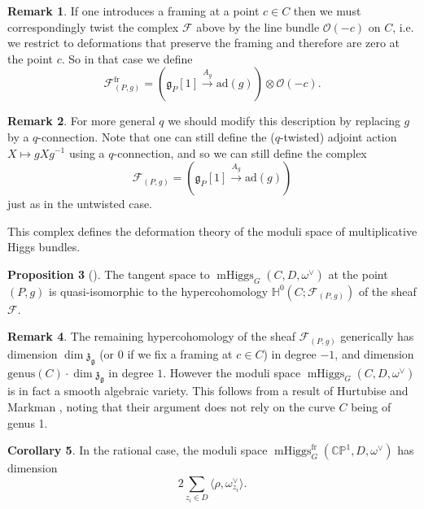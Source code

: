 \documentclass[11pt, oneside, reqno]{amsart}
\theoremstyle{definition} \newtheorem{definition}{Definition}[section]
\newtheorem{prop}[definition]{Proposition}
\newtheorem{corollary}[definition]{Corollary}
\theoremstyle{definition} \newtheorem{remark}[definition]{Remark}
\theoremstyle{definition} \newtheorem{remarks}[definition]{Remarks}
\theoremstyle{definition} \newtheorem{question}[definition]{Question}
\theoremstyle{definition} \newtheorem*{note}{Note}
\theoremstyle{definition} \newtheorem{example}[definition]{Example}
\theoremstyle{definition} \newtheorem{examples}[definition]{Examples}
\renewcommand{\gg}{\mathfrak{g}}
\newcommand{\bb}[1]{\mathbb{#1}}
\newcommand{\mr}[1]{\mathrm{#1}}
\newcommand{\mc}[1]{\mathcal{#1}}
\newcommand{\mf}[1]{\mathfrak{#1}}
\newcommand{\OO}{\mathcal{O}}
\DeclareMathOperator{\mhiggs}{mHiggs}
\newcommand{\fr}{\mathrm{fr}}
\newcommand{\ad}{\mr{ad}}
\begin{document}
\begin{remark}
If one introduces a framing at a point $c \in C$ then we must correspondingly twist the complex $\mc F$ above by the line bundle $\OO(-c)$ on $C$, i.e. we restrict to deformations that preserve the framing and therefore are zero at the point $c$.  So in that case we define
\[\mc F^\fr_{(P,g)} = (\gg_P[1] \overset {A_g} {\to} \ad(g)) \otimes \OO(-c).\]
\end{remark}

\begin{remark}
For more general $q$ we should modify this description by replacing $g$ by a $q$-connection.  Note that one can still define the ($q$-twisted) adjoint action $X \mapsto g X g^{-1}$ using a $q$-connection, and so we can still define the complex
\[\mc F_{(P,g)} = (\gg_P[1] \overset {A_g} {\to} \ad(g))\]
just as in the untwisted case.
\end{remark}

This complex defines the deformation theory of the moduli space of multiplicative Higgs bundles.

\begin{prop}[{\cite[Proposition 3.1.3]{Bottacin}}]
The tangent space to $\mhiggs_G(C, D, \omega^\vee)$ at the point $(P,g)$ is quasi-isomorphic to the hypercohomology $\bb H^0(C; \mc F_{(P,g)})$ of the sheaf $\mc F$.
\end{prop}

\begin{remark}
The remaining hypercohomology of the sheaf $\mc F_{(P,g)}$ generically has dimension $\dim \mf z_{\gg}$ (or 0 if we fix a framing at $c \in C$) in degree $-1$, and dimension $\mr{genus}(C) \cdot \dim \mf z_{\gg}$ in degree $1$.  However the moduli space $\mhiggs_G(C, D,\omega^\vee)$ is in fact a smooth algebraic variety.  This follows from a result of Hurtubise and Markman \cite[Theorem 4.13]{HurtubiseMarkman}, noting that their argument does not rely on the curve $C$ being of genus 1.
\end{remark}

\begin{corollary} \label{dim_of_moduli_space_cor}
In the rational case, the moduli space $\mhiggs^\fr_G(\bb{CP}^1, D, \omega^\vee)$ has dimension 
\[2 \sum_{z_i \in D} \langle \rho, \omega^\vee_{z_i} \rangle.\]
\end{corollary}
\end{document}
